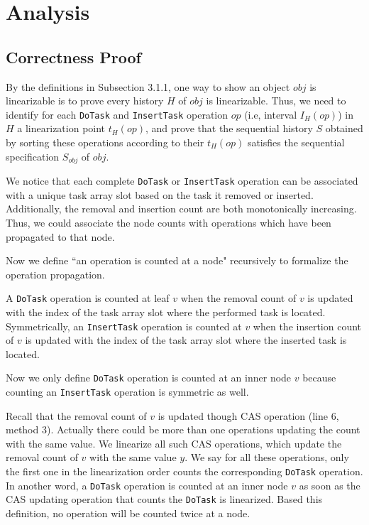 
\chapter{Analysis}

\section{Correctness Proof}
By the definitions in Subsection 3.1.1, one way to show an object $obj$ is linearizable is to prove every history $H$ of $obj$ is linearizable. Thus, we need to identify for each \texttt{DoTask} and \texttt{InsertTask} operation $op$ (i.e, interval $I_H(op)$) in $H$ a linearization point $t_H(op)$, and prove that the sequential history $S$ obtained by sorting these operations according to their $t_H(op)$ satisfies the sequential specification  $S_{obj}$  of $obj$.

We notice that each complete \texttt{DoTask} or \texttt{InsertTask} operation can be associated with a unique task array slot based on the task it removed or inserted. Additionally, the removal and insertion count are both monotonically increasing. Thus, we could associate the node counts with operations which have been propagated to that node.

Now we define ``an operation is counted at a node" recursively to formalize the operation propagation.

A \texttt{DoTask} operation is counted at leaf $v$ when the removal count of $v$ is updated with the index of the task array slot where the performed task is located. Symmetrically, an \texttt{InsertTask} operation is counted at $v$ when the insertion count of $v$ is updated with the index of the task array slot where the inserted task is located.

Now we only define \texttt{DoTask} operation is counted at an inner node $v$ because counting an \texttt{InsertTask} operation is symmetric as well.

Recall that the removal count of $v$ is updated though CAS operation (line 6, method 3). Actually there could be more than one operations updating the count with the same value. We linearize all such CAS operations, which update the removal count of $v$ with the same value $y$. We say for all these operations, only the first one in the linearization order counts the corresponding \texttt{DoTask} operation. In another word, a \texttt{DoTask} operation is counted at an inner node $v$ as soon as the CAS updating operation that counts the \texttt{DoTask} is linearized. Based this definition, no operation will be counted twice at a node.

